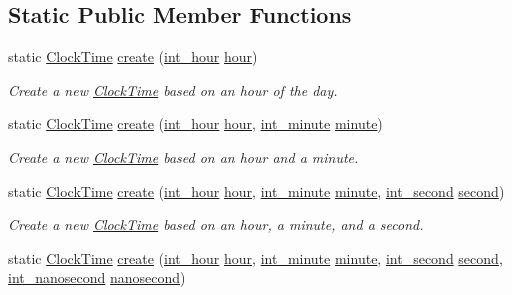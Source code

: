 \subsection*{Static Public Member Functions}
\begin{DoxyCompactItemize}
\item 
static \hyperlink{structClockTime}{Clock\-Time} \hyperlink{structClockTime_a72284f0c4f53d026688e55cea607f219}{create} (\hyperlink{types_8h_abc83767329d565949a30f9990b5b2323}{int\-\_\-hour} \hyperlink{structClockTime_a46aca2fc3ed57f80398729383d7b81d3}{hour})
\begin{DoxyCompactList}\small\item\em Create a new \hyperlink{structClockTime}{Clock\-Time} based on an hour of the day. \end{DoxyCompactList}\item 
static \hyperlink{structClockTime}{Clock\-Time} \hyperlink{structClockTime_aa4429a92963b67343bc6eab885938a5a}{create} (\hyperlink{types_8h_abc83767329d565949a30f9990b5b2323}{int\-\_\-hour} \hyperlink{structClockTime_a46aca2fc3ed57f80398729383d7b81d3}{hour}, \hyperlink{types_8h_ac1c9417e7360815b48bbc1efa2b8240c}{int\-\_\-minute} \hyperlink{structClockTime_a812681b81ece92f27756f0618e56f37b}{minute})
\begin{DoxyCompactList}\small\item\em Create a new \hyperlink{structClockTime}{Clock\-Time} based on an hour and a minute. \end{DoxyCompactList}\item 
static \hyperlink{structClockTime}{Clock\-Time} \hyperlink{structClockTime_a3a34039699358c31a6f68d545f228728}{create} (\hyperlink{types_8h_abc83767329d565949a30f9990b5b2323}{int\-\_\-hour} \hyperlink{structClockTime_a46aca2fc3ed57f80398729383d7b81d3}{hour}, \hyperlink{types_8h_ac1c9417e7360815b48bbc1efa2b8240c}{int\-\_\-minute} \hyperlink{structClockTime_a812681b81ece92f27756f0618e56f37b}{minute}, \hyperlink{types_8h_a48e89dcdfecb9766dce0baf6254d089e}{int\-\_\-second} \hyperlink{structClockTime_a568f139cb2e19fca3e2ae2acdf47787f}{second})
\begin{DoxyCompactList}\small\item\em Create a new \hyperlink{structClockTime}{Clock\-Time} based on an hour, a minute, and a second. \end{DoxyCompactList}\item 
static \hyperlink{structClockTime}{Clock\-Time} \hyperlink{structClockTime_afdf4e7a0b63e536f24a5eb85a3eb1ae8}{create} (\hyperlink{types_8h_abc83767329d565949a30f9990b5b2323}{int\-\_\-hour} \hyperlink{structClockTime_a46aca2fc3ed57f80398729383d7b81d3}{hour}, \hyperlink{types_8h_ac1c9417e7360815b48bbc1efa2b8240c}{int\-\_\-minute} \hyperlink{structClockTime_a812681b81ece92f27756f0618e56f37b}{minute}, \hyperlink{types_8h_a48e89dcdfecb9766dce0baf6254d089e}{int\-\_\-second} \hyperlink{structClockTime_a568f139cb2e19fca3e2ae2acdf47787f}{second}, \hyperlink{types_8h_a6bb2edd220168240795ae6d50d7bf140}{int\-\_\-nanosecond} \hyperlink{structClockTime_abba9faf8356211d4dc830ca3b3d38f18}{nanosecond})

\end{DoxyCompactItemize}

